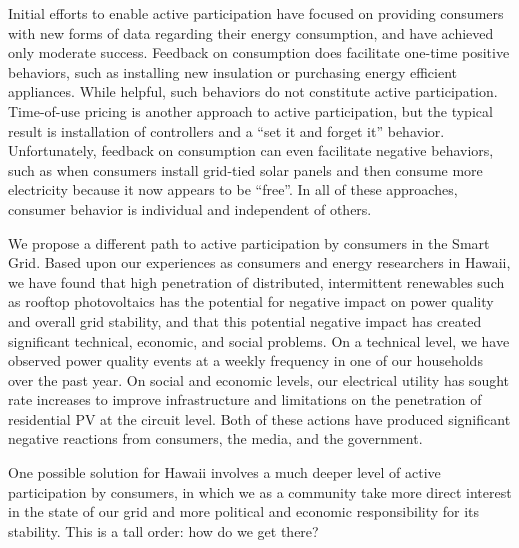 Initial efforts to enable active participation have focused on providing consumers with new forms of data regarding their energy consumption, and have achieved only moderate success.  Feedback on consumption does facilitate one-time positive behaviors, such as installing new insulation or purchasing energy efficient appliances. While helpful, such behaviors do not constitute active participation.    Time-of-use pricing is another approach to active participation, but the typical result is installation of controllers and a ``set it and forget it'' behavior.  Unfortunately, feedback on consumption can even facilitate negative behaviors, such as when consumers install grid-tied solar panels and then consume more electricity because it now appears to be ``free''.  In all of these approaches, consumer behavior is individual and independent of others. 

We propose a different path to active participation by consumers in the Smart Grid.  Based upon our experiences as consumers and energy researchers in Hawaii, we have found that high penetration of distributed, intermittent renewables such as rooftop photovoltaics has the potential for negative impact on power quality and overall grid stability, and that this potential negative impact has created significant technical, economic, and social problems.  On a technical level, we have observed power quality events at a weekly frequency in one of our households over the past year. On social and economic levels, our electrical utility has sought rate increases to improve infrastructure and limitations on the penetration of residential PV at the circuit level. Both of these actions have produced significant negative reactions from consumers, the media, and the government. 

One possible solution for Hawaii involves a much deeper level of active participation by consumers, in which we as a community take more direct interest in the state of our grid and more political and economic responsibility for its stability.  This is a tall order: how do we get there?

